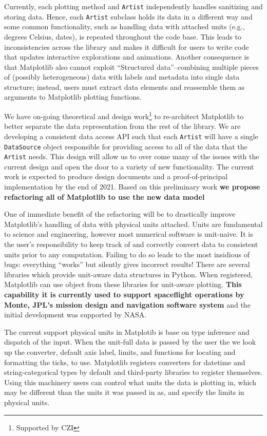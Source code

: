 \documentclass[12pt]{article}
\numberwithin{page}{section}
\begin{document}
Currently, each plotting method and \texttt{Artist} independently
handles sanitizing and storing data.  Hence, each \texttt{Artist}
subclass holds its data in a different way and some common
functionality, such as handling data with attached units (e.g.,
degrees Celsius, dates), is repeated throughout the code base.  This
leads to inconsistencies across the library and makes it difficult for
users to write code that updates interactive explorations and
animations.  Another consequence is that Matplotlib also cannot
exploit ``Structured data''--combining multiple pieces of (possibly
heterogeneous) data with labels and metadata into single data
structure; instead, users must extract data elements and reassemble
them as arguments to Matplotlib plotting functions.

We have on-going theoretical and design work\footnote{Supported by
CZI} to re-architect Matplotlib to better separate the data
representation from the rest of the library.  We are developing a
consistent data access API such that each \texttt{Artist} will have a
single \texttt{DataSource} object responsible for providing access to
all of the data that the \texttt{Artist} needs.  This design will
allow us to over come many of the issues with the current design and
open the door to a variety of new functionality.  The current work is
expected to produce design documents and a proof-of-principal
implementation by the end of 2021.  Based on this preliminary work
\textbf{we propose refactoring all of Matplotlib to use the new data
  model}

One of immediate benefit of the refactoring will be to drastically
improve Matplotlib's handling of data with physical units attached.
Units are fundamental to science and engineering, however most
numerical software is unit-naive.  It is the user's responsibility to
keep track of and correctly convert data to consistent units prior to
any computation.  Failing to do so leads to the most insidious of
bugs: everything ``works'' but silently gives incorrect results!
There are several libraries which provide unit-aware data structures
in Python.  When registered, Matplotlib can use object from these
libraries for unit-aware plotting.  \textbf{This capability it is
  currently used to support spaceflight operations by Monte, JPL's
  mission design and navigation software system} and the initial
development was supported by NASA.


The current support physical units in Matplotib is base on type
inference and dispatch of the input.  When the unit-full data is
passed by the user the we look up the converter, default axis label,
limits, and functions for locating and formatting the ticks, to use.
Matplotlib registers converters for datetime and string-categorical
types by default and third-party libraries to register themselves.
Using this machinery users can control what units the data is plotting
in, which may be different than the units it was passed in as, and
specify the limits in physical units.
\end{document}
